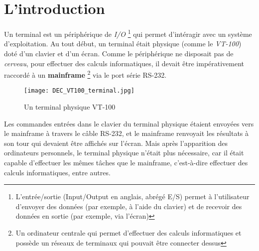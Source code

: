 \chapter{L'introduction}
Un terminal est un périphérique de \textit{I/O} \footnote {L'entrée/sortie (Input/Output en anglais, abrégé E/S) permet à l'utilisateur d'envoyer des données (par exemple, à l'aide du clavier) et de recevoir des données en sortie (par exemple, via l'écran)} qui permet d'intéragir avec un système d'exploitation. Au tout début, un terminal était physique (comme le \textit{VT-100}) doté d'un clavier et d'un écran. Comme le périphérique ne disposait pas de \textit{cerveau}, pour effectuer des calculs informatiques, il devait être impérativement raccordé à un \textbf{mainframe} \footnote{Un ordinateur centrale qui permet d'effectuer des calculs informatiques et possède un réseaux de terminaux qui pouvait être connecter dessus} via le port série RS-232.
\newline
\begin{figure}[h]
	\centering
	\texttt{[image: DEC\_VT100\_terminal.jpg]}
	\caption{Un terminal physique VT-100}
\end{figure}
\newline
Les commandes entrées dans le clavier du terminal physique étaient envoyées vers le mainframe à travers le câble RS-232, et le mainframe renvoyait les résultats à son tour qui devaient être affichés sur l'écran. Mais après l'apparition des ordinateurs personnels, le terminal physique n'était plus nécessaire, car il était capable d'effectuer les mêmes tâches que le mainframe, c'est-à-dire effectuer des calculs informatiques, entre autres.
